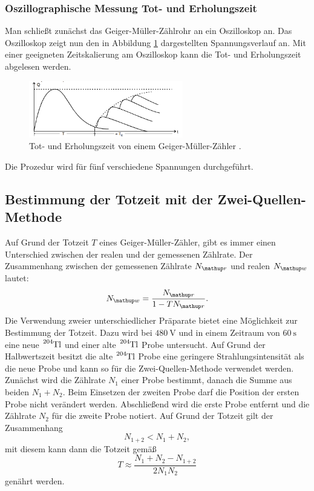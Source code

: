 \subsubsection{Oszillographische Messung Tot- und Erholungszeit} %
Man schließt zunächst das Geiger-Müller-Zählrohr an ein
Oszilloskop an. Das Oszilloskop zeigt nun den in Abbildung \ref{fig: totzeit}
dargestellten Spannungsverlauf an. Mit einer geeigneten Zeitskalierung am Oszilloskop
kann die Tot- und Erholungszeit abgelesen werden.
\begin{figure}
  \centering
  \includegraphics[width=0.6\textwidth]{bilder/totzeit.png}
  \caption{Tot- und Erholungszeit von einem Geiger-Müller-Zähler \cite{anleitung703}.}
  \label{fig: totzeit}
  \end{figure}
Die Prozedur wird für fünf verschiedene Spannungen durchgeführt.

\subsection{Bestimmung der Totzeit mit der Zwei-Quellen-Methode}
Auf Grund der Totzeit $T$ eines Geiger-Müller-Zähler, gibt es immer einen
Unterschied zwischen der realen und der gemessenen Zählrate. %
Der Zusammenhang zwischen der gemessenen Zählrate $N\ua{r}$ und
realen $N\ua{w}$ lautet: %
\begin{equation}
  \label{eq:wahre_zaehlrate}
  N\ua{w}=\frac{N\ua{r}}{1-TN\ua{r}}.
\end{equation}
Die Verwendung zweier unterschiedlicher Präparate bietet eine Möglichkeit zur %
Bestimmung der Totzeit. Dazu wird bei $\SI{480}{\volt}$ und in einem Zeitraum von $\SI{60}{\second}$ eine neue %
$\ce{^{204}Tl}$ und einer alte $\ce{^{204}Tl}$ Probe untersucht.
Auf Grund der Halbwertszeit besitzt die alte $\ce{^{204}Tl}$ Probe eine geringere
Strahlungsintensität als die neue Probe und kann so für die Zwei-Quellen-Methode verwendet
werden.  %
Zunächst wird die Zählrate $N_1$ einer Probe bestimmt, danach die %
Summe aus beiden $N_1+N_2$. Beim Einsetzen der zweiten Probe darf die Position der
ersten Probe nicht verändert werden.
Abschließend wird die erste Probe entfernt und die Zählrate $N_2$ für die zweite
Probe notiert.
Auf Grund der Totzeit gilt der Zusammenhang
\begin{equation}
  \label{eq:totzeit_summe}
  N_{1+2}<N_1+N_2,
\end{equation}
mit diesem kann dann die Totzeit gemäß %
\begin{equation}
  \label{eq:totzeit}
  T\approx \frac{N_1+N_2-N_{1+2}}{2N_1N_2}
\end{equation}
genährt werden.

